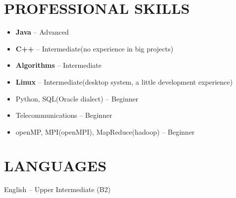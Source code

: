 \documentclass[margin,12pt]{res}
\begin{document}
\begin{resume}
\section{PROFESSIONAL SKILLS}
\begin{itemize} \itemsep -2pt
  \item \textbf{Java} -- Advanced\\
  \item \textbf{C++} -- Intermediate(no experience in big projects)\\
  \item \textbf{Algorithms} -- Intermediate\\
  \item \textbf{Linux} -- Intermediate(desktop system, a little
    development experience)\\
  \item Python, SQL(Oracle dialect) -- Beginner\\
  \item Telecommunications -- Beginner\\
  \item openMP, MPI(openMPI), MapReduce(hadoop) -- Beginner\\
\end{itemize}
\section{LANGUAGES} 
English -- Upper Intermediate (B2)\\
\end{resume}
\end{document}
